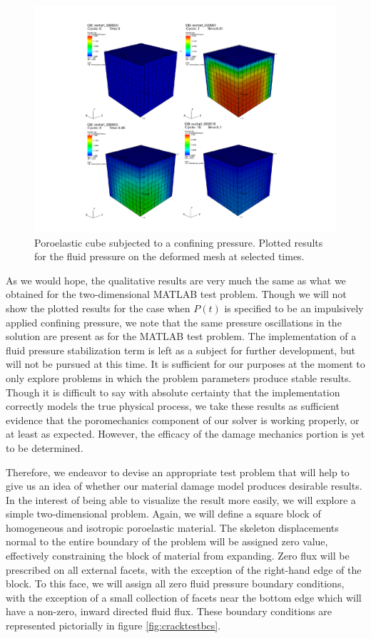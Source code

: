 \documentclass[11pt]{article} %
\begin{document}
\begin{figure} [!ht]
	\centering
	\includegraphics[width = 5.0in,trim=120 30 140 40,clip=true]{cubetest.pdf}
	\caption{Poroelastic cube subjected to a confining pressure. Plotted results for the fluid pressure on the deformed mesh at selected times.}
	\label{fig:cubetest}
\end{figure}

As we would hope, the qualitative results are very much the same as what we obtained for the two-dimensional MATLAB test problem. Though we will not show the plotted results for the case when $P(t)$ is specified to be an impulsively applied confining pressure, we note that the same pressure oscillations in the solution are present as for the MATLAB test problem. The implementation of a fluid pressure stabilization term is left as a subject for further development, but will not be pursued at this time. It is sufficient for our purposes at the moment to only explore problems in which the problem parameters produce stable results. Though it is difficult to say with absolute certainty that the implementation correctly models the true physical process, we take these results as sufficient evidence that the poromechanics component of our solver is working properly, or at least as expected. However, the efficacy of the damage mechanics portion is yet to be determined.

Therefore, we endeavor to devise an appropriate test problem that will help to give us an idea of whether our material damage model produces desirable results. In the interest of being able to visualize the result more easily, we will explore a simple two-dimensional problem. Again, we will define a square block of homogeneous and isotropic poroelastic material. The skeleton displacements normal to the entire boundary of the problem will be assigned zero value, effectively constraining the block of material from expanding. Zero flux will be prescribed on all external facets, with the exception of the right-hand edge of the block. To this face, we will assign all zero fluid pressure boundary conditions, with the exception of a small collection of facets near the bottom edge which will have a non-zero, inward directed fluid flux. These boundary conditions are represented pictorially in figure \ref{fig:cracktestbcs}.
\end{document}

